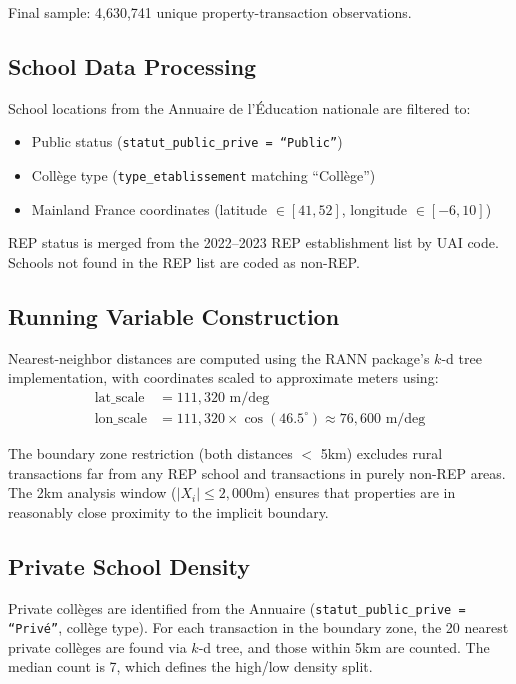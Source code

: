 \documentclass[12pt]{article}
\begin{document}
Final sample: 4,630,741 unique property-transaction observations.

\subsection{School Data Processing}

School locations from the Annuaire de l'\'{E}ducation nationale are filtered to:
\begin{itemize}
\item Public status (\texttt{statut\_public\_prive = ``Public''})
\item Coll\`{e}ge type (\texttt{type\_etablissement} matching ``Coll\`{e}ge'')
\item Mainland France coordinates (latitude $\in [41, 52]$, longitude $\in [-6, 10]$)
\end{itemize}

REP status is merged from the 2022--2023 REP establishment list by UAI code. Schools not found in the REP list are coded as non-REP.

\subsection{Running Variable Construction}

Nearest-neighbor distances are computed using the RANN package's $k$-d tree implementation, with coordinates scaled to approximate meters using:
\begin{align}
\text{lat\_scale} &= 111{,}320 \text{ m/deg} \\
\text{lon\_scale} &= 111{,}320 \times \cos(46.5^{\circ}) \approx 76{,}600 \text{ m/deg}
\end{align}

The boundary zone restriction (both distances $<$ 5km) excludes rural transactions far from any REP school and transactions in purely non-REP areas. The 2km analysis window ($|X_i| \leq 2{,}000$m) ensures that properties are in reasonably close proximity to the implicit boundary.

\subsection{Private School Density}

Private coll\`{e}ges are identified from the Annuaire (\texttt{statut\_public\_prive = ``Priv\'{e}''}, coll\`{e}ge type). For each transaction in the boundary zone, the 20 nearest private coll\`{e}ges are found via $k$-d tree, and those within 5km are counted. The median count is 7, which defines the high/low density split.
\end{document}
